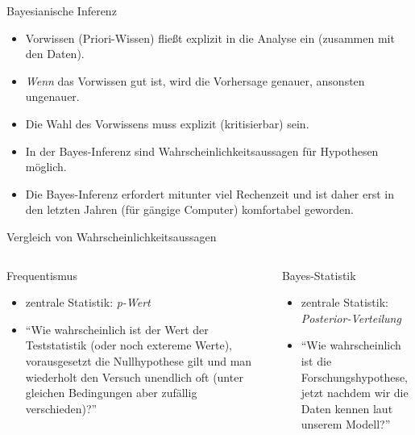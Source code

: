 \documentclass[
  ngerman,
  ignorenonframetext,
]{beamer}
\providecommand{\tightlist}{%
  \setlength{\itemsep}{0pt}\setlength{\parskip}{0pt}}
\begin{document}
\begin{frame}{Bayesianische Inferenz}
\protect\hypertarget{bayesianische-inferenz}{}
\begin{itemize}
\tightlist
\item
  Vorwissen (Priori-Wissen) fließt explizit in die Analyse ein (zusammen
  mit den Daten).
\item
  \emph{Wenn} das Vorwissen gut ist, wird die Vorhersage genauer,
  ansonsten ungenauer.
\item
  Die Wahl des Vorwissens muss explizit (kritisierbar) sein.
\item
  In der Bayes-Inferenz sind Wahrscheinlichkeitsaussagen für Hypothesen
  möglich.
\item
  Die Bayes-Inferenz erfordert mitunter viel Rechenzeit und ist daher
  erst in den letzten Jahren (für gängige Computer) komfortabel
  geworden.
\end{itemize}
\end{frame}

\begin{frame}{Vergleich von Wahrscheinlichkeitsaussagen}
\protect\hypertarget{vergleich-von-wahrscheinlichkeitsaussagen}{}
\begin{columns}[T]
\begin{column}{0.48\textwidth}
\begin{block}{Frequentismus}
\protect\hypertarget{frequentismus}{}
\begin{itemize}
\item
  zentrale Statistik: \emph{p-Wert}
\item
  ``Wie wahrscheinlich ist der Wert der Teststatistik (oder noch
  extereme Werte), vorausgesetzt die Nullhypothese gilt und man
  wiederholt den Versuch unendlich oft (unter gleichen Bedingungen aber
  zufällig verschieden)?''
\end{itemize}
\end{block}
\end{column}

\begin{column}{0.48\textwidth}
\begin{block}{Bayes-Statistik}
\protect\hypertarget{bayes-statistik}{}
\begin{itemize}
\item
  zentrale Statistik: \emph{Posterior-Verteilung}
\item
  ``Wie wahrscheinlich ist die Forschungshypothese, jetzt nachdem wir
  die Daten kennen laut unserem Modell?''
\end{itemize}
\end{block}
\end{column}
\end{columns}
\end{frame}
\end{document}
